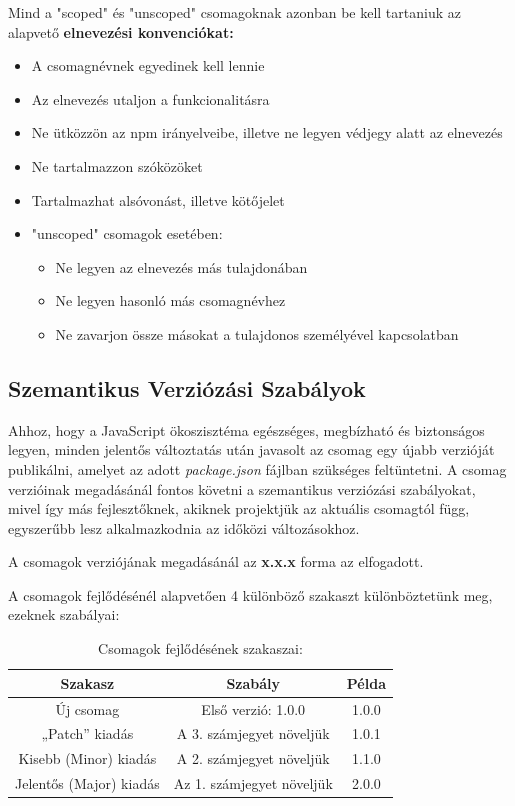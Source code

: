 	Mind a "scoped" és "unscoped" csomagoknak azonban be kell tartaniuk az alapvető \textbf{elnevezési konvenciókat:}
	
	\begin{itemize}
		\item A csomagnévnek egyedinek kell lennie
		\item Az elnevezés utaljon a funkcionalitásra
		\item Ne ütközzön az npm irányelveibe, illetve ne legyen védjegy alatt az elnevezés
		\item Ne tartalmazzon szóközöket
		\item Tartalmazhat alsóvonást, illetve kötőjelet
		\item "unscoped" csomagok esetében:
		\begin{itemize}
			\item Ne legyen az elnevezés más tulajdonában
			\item Ne legyen hasonló más csomagnévhez
			\item Ne zavarjon össze másokat a tulajdonos személyével kapcsolatban
		\end{itemize}
	\end{itemize}

	\begin{flushright}
		\cite{npm-scope} \cite{npm-naming}
	\end{flushright}

	\subsection{Szemantikus Verziózási Szabályok}
	
	Ahhoz, hogy a JavaScript ökoszisztéma egészséges, megbízható és biztonságos legyen, minden jelentős változtatás után javasolt az csomag egy újabb verzióját publikálni, amelyet az adott \emph{package.json} fájlban szükséges feltüntetni. A csomag verzióinak megadásánál fontos követni a szemantikus verziózási szabályokat, mivel így más fejlesztőknek, akiknek projektjük az aktuális csomagtól függ, egyszerűbb lesz alkalmazkodnia az időközi változásokhoz.
	
	A csomagok verziójának megadásánál az \textbf{x.x.x} forma az elfogadott.
	
	A csomagok fejlődésénél alapvetően 4 különböző szakaszt különböztetünk meg, ezeknek szabályai:
	
	\begin{table}[h]
		\centering
		\caption{Csomagok fejlődésének szakaszai:}
		\label{tab:package-lifecycle}
		\begin{tabular}{|c|c|c|}
			\hline
			\textbf{Szakasz} & \textbf{Szabály} & \textbf{Példa} \\
			\hline
			Új csomag & Első verzió: 1.0.0 & 1.0.0 \\
			\hline
			„Patch” kiadás & A 3. számjegyet növeljük & 1.0.1 \\
			\hline
			Kisebb (Minor) kiadás & A 2. számjegyet növeljük & 1.1.0 \\
			\hline
			Jelentős (Major) kiadás & Az 1. számjegyet növeljük & 2.0.0 \\
			\hline
		\end{tabular}
	\end{table}


